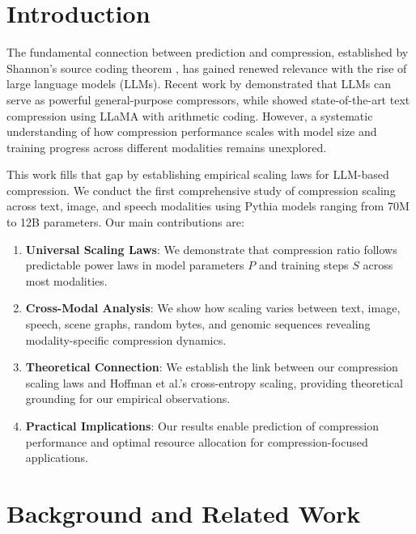 \documentclass[11pt]{article}
\begin{document}
\section{Introduction}

The fundamental connection between prediction and compression, established by Shannon's source coding theorem \citep{shannon1948mathematical}, has gained renewed relevance with the rise of large language models (LLMs). Recent work by \citet{deletang2023compression} demonstrated that LLMs can serve as powerful general-purpose compressors, while \citet{kaushik2023llmzip} showed state-of-the-art text compression using LLaMA with arithmetic coding. However, a systematic understanding of how compression performance scales with model size and training progress across different modalities remains unexplored.

This work fills that gap by establishing empirical scaling laws for LLM-based compression. We conduct the first comprehensive study of compression scaling across text, image, and speech modalities using Pythia models \citep{biderman2023pythia} ranging from 70M to 12B parameters. Our main contributions are:

\begin{enumerate}
\item \textbf{Universal Scaling Laws}: We demonstrate that compression ratio follows predictable power laws in model parameters $P$ and training steps $S$ across most modalities.
\item \textbf{Cross-Modal Analysis}: We show how scaling varies between text, image, speech, scene graphs, random bytes, and genomic sequences revealing modality-specific compression dynamics.
\item \textbf{Theoretical Connection}: We establish the link between our compression scaling laws and Hoffman et al.'s cross-entropy scaling, providing theoretical grounding for our empirical observations.



\item \textbf{Practical Implications}: Our results enable prediction of compression performance and optimal resource allocation for compression-focused applications.
\end{enumerate}

\section{Background and Related Work}
\end{document}
